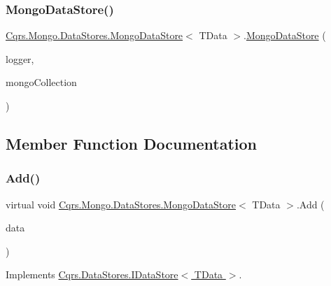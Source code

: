 \subsubsection{\texorpdfstring{Mongo\+Data\+Store()}{MongoDataStore()}}
{\footnotesize\ttfamily \hyperlink{classCqrs_1_1Mongo_1_1DataStores_1_1MongoDataStore}{Cqrs.\+Mongo.\+Data\+Stores.\+Mongo\+Data\+Store}$<$ T\+Data $>$.\hyperlink{classCqrs_1_1Mongo_1_1DataStores_1_1MongoDataStore}{Mongo\+Data\+Store} (\begin{DoxyParamCaption}\item[{I\+Logger}]{logger,  }\item[{\hyperlink{classCqrs_1_1Mongo_1_1DataStores_1_1MongoDataStore_aa183a8ce44ec16d755f1e4fbe5ec4b10}{Mongo\+Collection}$<$ T\+Data $>$}]{mongo\+Collection }\end{DoxyParamCaption})}



\subsection{Member Function Documentation}
\mbox{\label{classCqrs_1_1Mongo_1_1DataStores_1_1MongoDataStore_a27bcfb40fe8203e09d320b2aa19fff3a}} 
\subsubsection{\texorpdfstring{Add()}{Add()}\hspace{0.1cm}{\footnotesize\ttfamily [1/2]}}
{\footnotesize\ttfamily virtual void \hyperlink{classCqrs_1_1Mongo_1_1DataStores_1_1MongoDataStore}{Cqrs.\+Mongo.\+Data\+Stores.\+Mongo\+Data\+Store}$<$ T\+Data $>$.Add (\begin{DoxyParamCaption}\item[{T\+Data}]{data }\end{DoxyParamCaption})\hspace{0.3cm}{\ttfamily [virtual]}}



Implements \hyperlink{interfaceCqrs_1_1DataStores_1_1IDataStore_a114404daaf37fec9cc5547cd9a17858c}{Cqrs.\+Data\+Stores.\+I\+Data\+Store$<$ T\+Data $>$}.

